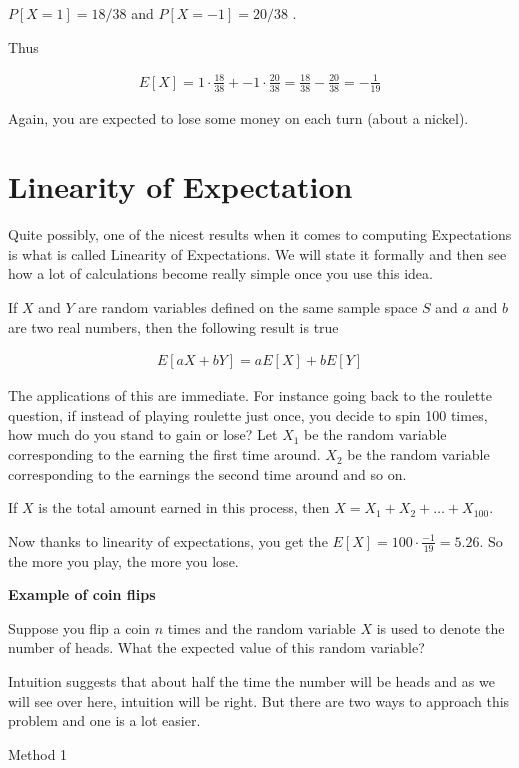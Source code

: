 \documentclass[12pt]{article}
\begin{document}
$P[X = 1] = 18/38$ and  $P[X = −1] = 20/38$ . 

Thus

\begin{align*}
E[X] = 1 \cdot \frac{18}{38} + -1 \cdot \frac{20}{38} = \frac{18}{38} - \frac{20}{38} = -\frac{1}{19}
\end{align*}

Again, you are expected to lose some money on each turn (about a nickel).

\section*{Linearity of Expectation}
Quite possibly, one of the nicest results when it comes to computing Expectations is what is called Linearity of Expectations. We will state it formally and then see how a lot of calculations become really simple once you use this idea.

If $X$ and $Y$ are random variables defined on the same sample space $S$ and $a$ and $b$ are two real numbers, then the following result is true

\begin{align*}
E[aX + bY] = a E[X] + bE[Y]
\end{align*}

The applications of this are immediate. For instance going back to the roulette question, if instead of playing roulette just once, you decide to spin 100 times, how much do you stand to gain or lose?
Let $X_1$ be the random variable corresponding to the earning the first time around. $X_2$ be the random variable corresponding to the earnings the second time around and so on. 

If $X$ is the total amount earned in this process, then $X = X_1 + X_2 + \ldots + X_{100}$. 

Now thanks to linearity of expectations, you get the $E[X] = 100 \cdot \frac{-1}{19} = 5.26$. So the more you play, the more you lose. 

\textbf{Example of coin flips}

Suppose you flip a coin $n$ times and the random variable $X$ is used to denote the number of heads. What the expected value of this random variable?

Intuition suggests that about half the time the number will be heads and as we will see over here, intuition will be right. But there are two ways to approach this problem and one is a lot easier.

Method 1
\end{document}
